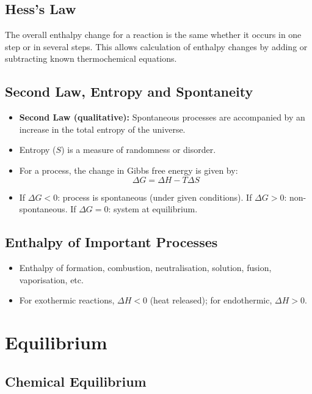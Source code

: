 \documentclass[12pt,a4paper]{article}
\begin{document}
\subsection{Hess's Law}
The overall enthalpy change for a reaction is the same whether it occurs in one step or in several steps.  
This allows calculation of enthalpy changes by adding or subtracting known thermochemical equations.

\subsection{Second Law, Entropy and Spontaneity}
\begin{itemize}
    \item \textbf{Second Law (qualitative):} Spontaneous processes are accompanied by an increase in the total entropy of the universe.
    \item Entropy ($S$) is a measure of randomness or disorder.
    \item For a process, the change in Gibbs free energy is given by:
    \[
    \Delta G = \Delta H - T\Delta S
    \]
    \item If $\Delta G < 0$: process is spontaneous (under given conditions).  
    If $\Delta G > 0$: non-spontaneous.  
    If $\Delta G = 0$: system at equilibrium.
\end{itemize}

\subsection{Enthalpy of Important Processes}
\begin{itemize}
    \item Enthalpy of formation, combustion, neutralisation, solution, fusion, vaporisation, etc.
    \item For exothermic reactions, $\Delta H < 0$ (heat released); for endothermic, $\Delta H > 0$.
\end{itemize}

\clearpage


\section{Equilibrium}

\subsection{Chemical Equilibrium}
\end{document}
